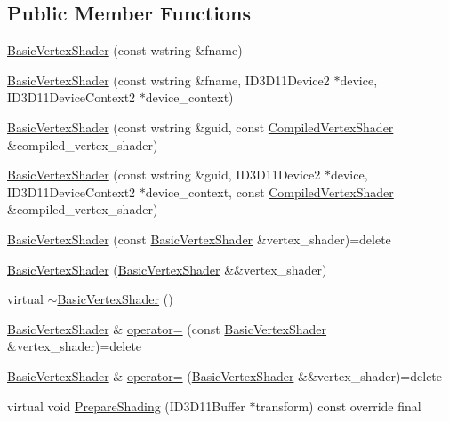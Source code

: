 \subsection*{Public Member Functions}
\begin{DoxyCompactItemize}
\item 
\hyperlink{classmage_1_1_basic_vertex_shader_ab00129cc3b679e531480153ece6a2456}{Basic\+Vertex\+Shader} (const wstring \&fname)
\item 
\hyperlink{classmage_1_1_basic_vertex_shader_aa9db9c5bd780abfc08403df4374a6a15}{Basic\+Vertex\+Shader} (const wstring \&fname, I\+D3\+D11\+Device2 $\ast$device, I\+D3\+D11\+Device\+Context2 $\ast$device\+\_\+context)
\item 
\hyperlink{classmage_1_1_basic_vertex_shader_a3a02247741bd490e39810dd5a82f38db}{Basic\+Vertex\+Shader} (const wstring \&guid, const \hyperlink{structmage_1_1_compiled_vertex_shader}{Compiled\+Vertex\+Shader} \&compiled\+\_\+vertex\+\_\+shader)
\item 
\hyperlink{classmage_1_1_basic_vertex_shader_ac307671eda382d81c236bdedd511a44f}{Basic\+Vertex\+Shader} (const wstring \&guid, I\+D3\+D11\+Device2 $\ast$device, I\+D3\+D11\+Device\+Context2 $\ast$device\+\_\+context, const \hyperlink{structmage_1_1_compiled_vertex_shader}{Compiled\+Vertex\+Shader} \&compiled\+\_\+vertex\+\_\+shader)
\item 
\hyperlink{classmage_1_1_basic_vertex_shader_ab547bf423545c41882a691ff3ebb32ce}{Basic\+Vertex\+Shader} (const \hyperlink{classmage_1_1_basic_vertex_shader}{Basic\+Vertex\+Shader} \&vertex\+\_\+shader)=delete
\item 
\hyperlink{classmage_1_1_basic_vertex_shader_a1c5f899e5dfaf81609e8e8fd73103ab2}{Basic\+Vertex\+Shader} (\hyperlink{classmage_1_1_basic_vertex_shader}{Basic\+Vertex\+Shader} \&\&vertex\+\_\+shader)
\item 
virtual \hyperlink{classmage_1_1_basic_vertex_shader_ad155c4135f5517667020ec519a3597c9}{$\sim$\+Basic\+Vertex\+Shader} ()
\item 
\hyperlink{classmage_1_1_basic_vertex_shader}{Basic\+Vertex\+Shader} \& \hyperlink{classmage_1_1_basic_vertex_shader_ab3d355e76715b24e21fb37c239d41932}{operator=} (const \hyperlink{classmage_1_1_basic_vertex_shader}{Basic\+Vertex\+Shader} \&vertex\+\_\+shader)=delete
\item 
\hyperlink{classmage_1_1_basic_vertex_shader}{Basic\+Vertex\+Shader} \& \hyperlink{classmage_1_1_basic_vertex_shader_ae5442c36b5f913ac6644cc2945a8c20a}{operator=} (\hyperlink{classmage_1_1_basic_vertex_shader}{Basic\+Vertex\+Shader} \&\&vertex\+\_\+shader)=delete
\item 
virtual void \hyperlink{classmage_1_1_basic_vertex_shader_ae565cb19b96591d5d1ff36ac0ff7344c}{Prepare\+Shading} (I\+D3\+D11\+Buffer $\ast$transform) const override final
\end{DoxyCompactItemize}
